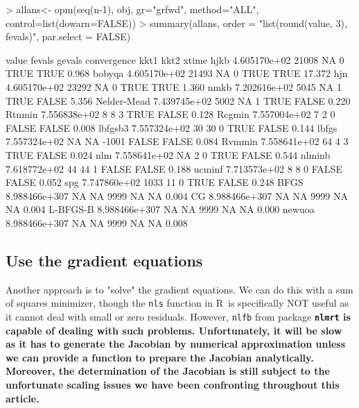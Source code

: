 \documentclass[11pt]{article}
\newcommand{\R}{{\sf R}}
\newcommand{\code}[1]{{\tt#1}}
\newcommand{\pkg}[1]{\bf{\tt#1}\rm }
\begin{document}
\begin{Schunk}
\begin{Sinput}
> allans<- opm(seq(n-1), obj, gr="grfwd", method="ALL", control=list(dowarn=FALSE))
> summary(allans, order = "list(round(value, 3), fevals)", par.select = FALSE)
\end{Sinput}
\begin{Soutput}
                    value fevals gevals convergence  kkt1  kkt2  xtime
hjkb         4.605170e+02  21008     NA           0  TRUE  TRUE  0.968
bobyqa       4.605170e+02  21493     NA           0  TRUE  TRUE 17.372
hjn          4.605170e+02  23292     NA           0  TRUE  TRUE  1.360
nmkb         7.202616e+02   5045     NA           1  TRUE FALSE  5.356
Nelder-Mead  7.439745e+02   5002     NA           1  TRUE FALSE  0.220
Rtnmin       7.556838e+02      8      8           3  TRUE FALSE  0.128
Rcgmin       7.557004e+02      7      2           0 FALSE FALSE  0.008
lbfgsb3      7.557324e+02     30     30           0  TRUE FALSE  0.144
lbfgs        7.557324e+02     NA     NA       -1001 FALSE FALSE  0.084
Rvmmin       7.558641e+02     64      4           3  TRUE FALSE  0.024
nlm          7.558641e+02     NA      2           0  TRUE FALSE  0.544
nlminb       7.618772e+02     44     44           1 FALSE FALSE  0.188
ucminf       7.713573e+02      8      8           0 FALSE FALSE  0.052
spg          7.747860e+02   1033     11           0  TRUE FALSE  0.248
BFGS        8.988466e+307     NA     NA        9999    NA    NA  0.004
CG          8.988466e+307     NA     NA        9999    NA    NA  0.004
L-BFGS-B    8.988466e+307     NA     NA        9999    NA    NA  0.000
newuoa      8.988466e+307     NA     NA        9999    NA    NA  0.008
\end{Soutput}
\end{Schunk}



\subsection{Use the gradient equations}

Another approach is to "solve" the gradient equations. We can do this with 
a sum of squares minimizer, though the \code{nls} function in \R\ is 
specifically NOT useful as it cannot deal
with small or zero residuals. However, \code{nlfb} 
from package \pkg{nlmrt} is capable of dealing
with such problems. Unfortunately, it will be slow as it has to 
generate the Jacobian by numerical
approximation unless we can provide a function to prepare the 
Jacobian analytically. Moreover,
the determination of the Jacobian is still subject to 
the unfortunate scaling issues we have
been confronting throughout this article.
\end{document}
